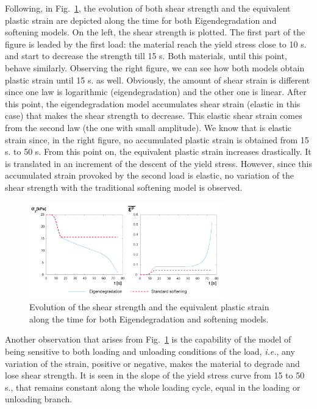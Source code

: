 \documentclass[applsci,journal,article,submit,moreauthors,pdftex]{Definitions/mdpi}
\begin{document}
Following, in Fig.~\ref{fig_VC3}, the evolution of both shear strength and the equivalent plastic strain are depicted along the time for both Eigendegradation and softening models. On the left, the shear strength is plotted. The first part of the figure is leaded by the first load: the material reach the yield stress close to 10 s. and start to decrease the strength till 15 s. Both materials, until this point, behave similarly. Observing the right figure, we can see how both models obtain plastic strain until 15 s. as well. Obviously, the amount of shear strain is different since one law is logarithmic (eigendegradation) and the other one is linear. After this point, the eigendegradation model accumulates shear strain (elastic in this case) that makes the shear strength to decrease. This elastic shear strain comes from the second law (the one with small amplitude). We know that is elastic strain since, in the right figure, no accumulated plastic strain is obtained from 15 s. to 50 s. From this point on, the equivalent plastic strain increases drastically. It is translated in an increment of the descent of the yield stress. However, since this accumulated strain provoked by the second load is elastic, no variation of the shear strength with the traditional softening model is observed. 

\begin{figure}
\centering
\includegraphics[width=0.75\textwidth]{Figs/evo_VC.pdf}
\caption{Evolution of the shear strength and the equivalent plastic strain along the time for both Eigendegradation and softening models.}
\label{fig_VC3}
\end{figure}

Another observation that arises from Fig.~\ref{fig_VC3} is the capability of the model of being sensitive to both loading and unloading conditions of the load, \textit{i.e.}, any variation of the strain, positive or negative, makes the material to degrade and lose shear strength. It is seen in the slope of the yield stress curve from 15 to 50 s., that remains constant along the whole loading cycle, equal in the loading or unloading branch.
\end{document}
